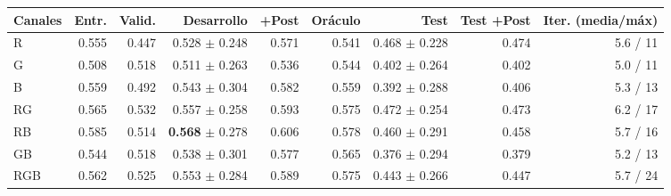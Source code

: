\footnotesize
\begin{tabular}{lrrrrrrrr}
\toprule
Canales & Entr. & Valid. & Desarrollo & +Post & Oráculo & Test & Test +Post & Iter. (media/máx) \\
\midrule
R & 0.555 & 0.447 & 0.528 $\pm$ 0.248 & 0.571 & 0.541 & 0.468 $\pm$ 0.228 & 0.474 & 5.6 / 11 \\
G & 0.508 & 0.518 & 0.511 $\pm$ 0.263 & 0.536 & 0.544 & 0.402 $\pm$ 0.264 & 0.402 & 5.0 / 11 \\
B & 0.559 & 0.492 & 0.543 $\pm$ 0.304 & 0.582 & 0.559 & 0.392 $\pm$ 0.288 & 0.406 & 5.3 / 13 \\
RG & 0.565 & 0.532 & 0.557 $\pm$ 0.258 & 0.593 & 0.575 & 0.472 $\pm$ 0.254 & 0.473 & 6.2 / 17 \\
RB & 0.585 & 0.514 & \textbf{0.568} $\pm$ 0.278 & 0.606 & 0.578 & 0.460 $\pm$ 0.291 & 0.458 & 5.7 / 16 \\
GB & 0.544 & 0.518 & 0.538 $\pm$ 0.301 & 0.577 & 0.565 & 0.376 $\pm$ 0.294 & 0.379 & 5.2 / 13 \\
RGB & 0.562 & 0.525 & 0.553 $\pm$ 0.284 & 0.589 & 0.575 & 0.443 $\pm$ 0.266 & 0.447 & 5.7 / 24 \\
\bottomrule
\end{tabular}
